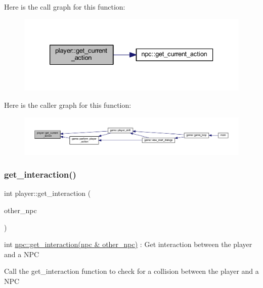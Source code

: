 Here is the call graph for this function\+:
\nopagebreak
\begin{figure}[H]
\begin{center}
\leavevmode
\includegraphics[width=333pt]{classplayer_afc7732284851b7f0d90b66a5d25931e2_cgraph}
\end{center}
\end{figure}
Here is the caller graph for this function\+:
\nopagebreak
\begin{figure}[H]
\begin{center}
\leavevmode
\includegraphics[width=350pt]{classplayer_afc7732284851b7f0d90b66a5d25931e2_icgraph}
\end{center}
\end{figure}
\mbox{\label{classplayer_ad93507550867df5598b86b73de01ec12}} 
\subsubsection{\texorpdfstring{get\+\_\+interaction()}{get\_interaction()}}
{\footnotesize\ttfamily int player\+::get\+\_\+interaction (\begin{DoxyParamCaption}\item[{\hyperlink{classnpc}{npc} \&}]{other\+\_\+npc }\end{DoxyParamCaption})}



int \hyperlink{classnpc_a2714b410c2e644040f69f1cf50d3bc50}{npc\+::get\+\_\+interaction(npc \& other\+\_\+npc)} \+: Get interaction between the player and a N\+PC 

Call the \textquotesingle{}get\+\_\+interaction\textquotesingle{} function to check for a collision between the player and a N\+PC

